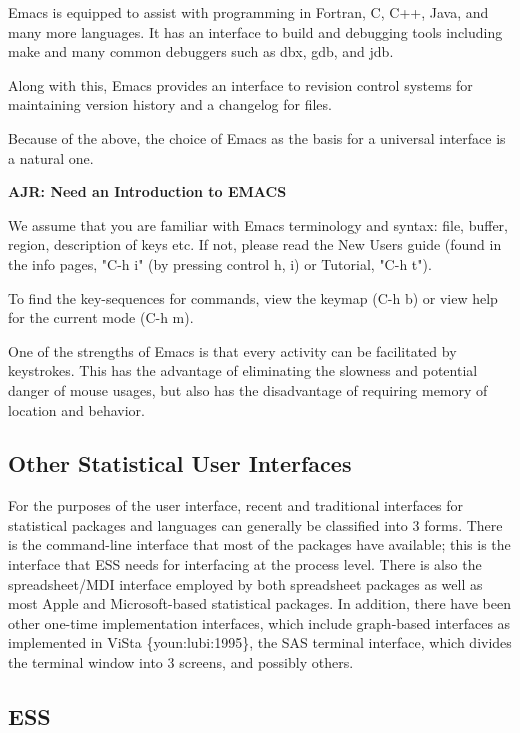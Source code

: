 \documentclass{article}
\newcommand{\citep}[1]{{\{\sf#1\}}}
\begin{document}
Emacs is equipped to assist with programming in Fortran, C, C++, Java,
and many more languages.  It has an interface to build and debugging
tools including make and many common debuggers such as dbx, gdb, and
jdb. 

Along with this, Emacs provides an interface to revision control
systems for maintaining version history and a changelog for files.

Because of the above, the choice of Emacs as the basis for a universal
interface is a natural one.  


\textbf{AJR: Need an Introduction to EMACS}

We assume that you are familiar with Emacs terminology and syntax:
file, buffer, region, description of keys etc.  If not, please read
the New Users guide (found in the info pages, "C-h i" (by pressing
control h, i) or Tutorial, "C-h t").

To find the key-sequences for commands, view the keymap (C-h b) or
view help for the current mode (C-h m).  

One of the strengths of Emacs is that every activity can be
facilitated by keystrokes.  This has the advantage of eliminating the
slowness and potential danger of mouse usages, but also has the
disadvantage of requiring memory of location and behavior.

\subsection{Other Statistical User Interfaces}
\label{sec:intro:UI}

For the purposes of the user interface, recent and traditional
interfaces for statistical packages and languages can generally be
classified into 3 forms.  There is the command-line interface that
most of the packages have available; this is the interface that ESS
needs for interfacing at the process level.  There is also the
spreadsheet/MDI interface employed by both spreadsheet packages as
well as most Apple and Microsoft-based statistical packages.  In
addition, there have been other one-time implementation interfaces,
which include graph-based interfaces as implemented in ViSta
\citep{youn:lubi:1995}, the SAS terminal interface, which divides the
terminal window into 3 screens, and possibly others.

\subsection{ESS}
\label{sec:intro:ESS}
\end{document}
